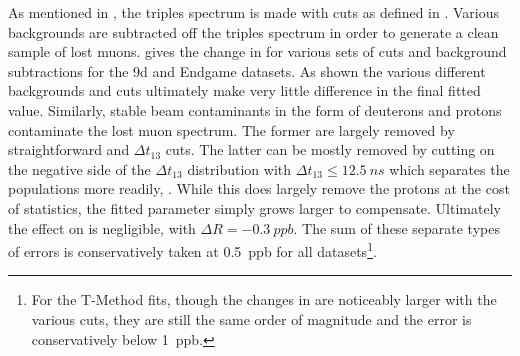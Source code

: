 As mentioned in , the triples spectrum is made with cuts as defined in . Various backgrounds are subtracted off the triples spectrum in order to generate a clean sample of lost muons.  gives the change in \R for various sets of cuts and background subtractions for the 9d and Endgame datasets. As shown the various different backgrounds and cuts ultimately make very little difference in the final fitted \R value. Similarly, stable beam contaminants in the form of deuterons and protons contaminate the lost muon spectrum. The former are largely removed by straightforward \DT and $\Delta t_{13}$ cuts. The latter can be mostly removed by cutting on the negative side of the $\Delta t_{13}$ distribution with $\Delta t_{13} \leq \SI{12.5}{ns}$ which separates the populations more readily, . While this does largely remove the protons at the cost of statistics, the fitted \K parameter simply grows larger to compensate. Ultimately the effect on \R is negligible, with $\Delta R = \SI{-0.3}{ppb}$. The sum of these separate types of errors is conservatively taken at \SI{0.5}{ppb} for all datasets\footnote{For the T-Method fits, though the changes in \R are noticeably larger with the various cuts, they are still the same order of magnitude and the error is conservatively below \SI{1}{ppb}.}.


